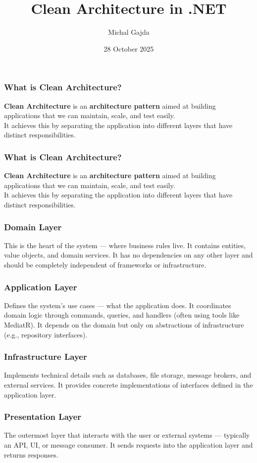 \documentclass{beamer}
\title{Clean Architecture in .NET}
\author{Michal Gajda}
\institute{.NET - Liverpool Meetup}
\date{28 October 2025}
\begin{document}
\frame{\titlepage}

\begin{frame}
\frametitle{What is Clean Architecture?}
{\bfseries Clean Architecture} is an {\bfseries architecture pattern} aimed at building applications that we can maintain, scale, and test easily.
\\
It achieves this by separating the application into different layers that have distinct responsibilities.
\end{frame}

\begin{frame}
\frametitle{What is Clean Architecture?}
{\bfseries Clean Architecture} is an {\bfseries architecture pattern} aimed at building applications that we can maintain, scale, and test easily.
\\
It achieves this by separating the application into different layers that have distinct responsibilities.
\end{frame}

\begin{frame}
\frametitle{Domain Layer}
This is the heart of the system — where business rules live. It contains entities, value objects, and domain services. It has no dependencies on any other layer and should be completely independent of frameworks or infrastructure.
\end{frame}

\begin{frame}
\frametitle{Application Layer}
Defines the system’s use cases — what the application does. It coordinates domain logic through commands, queries, and handlers (often using tools like MediatR). It depends on the domain but only on abstractions of infrastructure (e.g., repository interfaces).
\end{frame}

\begin{frame}
\frametitle{Infrastructure Layer}
Implements technical details such as databases, file storage, message brokers, and external services. It provides concrete implementations of interfaces defined in the application layer.
\end{frame}

\begin{frame}
\frametitle{Presentation Layer}
The outermost layer that interacts with the user or external systems — typically an API, UI, or message consumer. It sends requests into the application layer and returns responses.
\end{frame}
\end{document}
